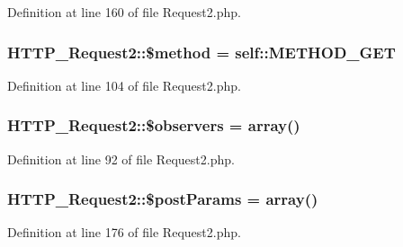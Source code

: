 Definition at line 160 of file Request2.\+php.

\subsubsection[{\texorpdfstring{\$method}{$method}}]{\setlength{\rightskip}{0pt plus 5cm}H\+T\+T\+P\+\_\+\+Request2\+::\$method = self\+::\+M\+E\+T\+H\+O\+D\+\_\+\+G\+ET\hspace{0.3cm}{\ttfamily [protected]}}\hypertarget{classHTTP__Request2_ae83c79d14f1b596d91b60862ea1370af}{}\label{classHTTP__Request2_ae83c79d14f1b596d91b60862ea1370af}


Definition at line 104 of file Request2.\+php.

\subsubsection[{\texorpdfstring{\$observers}{$observers}}]{\setlength{\rightskip}{0pt plus 5cm}H\+T\+T\+P\+\_\+\+Request2\+::\$observers = array()\hspace{0.3cm}{\ttfamily [protected]}}\hypertarget{classHTTP__Request2_ab57c87d4bee6cb35be6b976a8ec7ec2f}{}\label{classHTTP__Request2_ab57c87d4bee6cb35be6b976a8ec7ec2f}


Definition at line 92 of file Request2.\+php.

\subsubsection[{\texorpdfstring{\$post\+Params}{$postParams}}]{\setlength{\rightskip}{0pt plus 5cm}H\+T\+T\+P\+\_\+\+Request2\+::\$post\+Params = array()\hspace{0.3cm}{\ttfamily [protected]}}\hypertarget{classHTTP__Request2_a77aa571439401e1cd2adc407f4bdc222}{}\label{classHTTP__Request2_a77aa571439401e1cd2adc407f4bdc222}


Definition at line 176 of file Request2.\+php.

